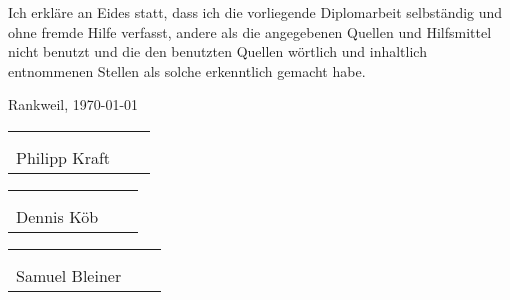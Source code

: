 Ich erkläre an Eides statt, dass ich die vorliegende Diplomarbeit selbständig und ohne fremde Hilfe verfasst, andere als die angegebenen Quellen und Hilfsmittel nicht benutzt und die den benutzten Quellen wörtlich und inhaltlich entnommenen Stellen als solche erkenntlich gemacht habe.

\vspace*{1cm}
Rankweil, \today

\vspace*{2cm}


\begin{center}
\begin{tabular}{cp{2em}c} 
  \hspace{6cm} \\\cline{1-1}\cline{3-3}
  \\[-3mm]
  {\footnotesize Philipp Kraft}
\end{tabular}

\vspace*{1cm}

\begin{tabular}{cp{2em}c} 
  \hspace{6cm} \\\cline{1-1}\cline{3-3}
  \\[-3mm]
  {\footnotesize Dennis Köb}
\end{tabular}

\vspace*{1cm}

\begin{tabular}{cp{2em}c} 
  \hspace{6cm} \\\cline{1-1}\cline{3-3}
  \\[-3mm]
  {\footnotesize Samuel Bleiner}
\end{tabular}

\end{center}

\cleardoublepage

